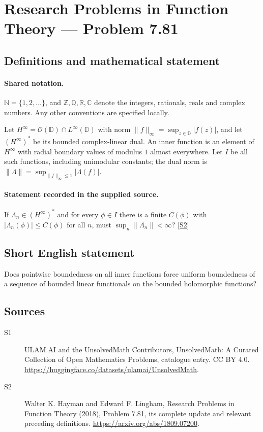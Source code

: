 \documentclass[11pt]{article}
\newcommand{\sref}[2]{\hyperlink{source:#1:#2}{[S#2]}}
\begin{document}
\section{Research Problems in Function Theory — Problem 7.81}\label{statement}

\subsection{Definitions and mathematical statement}

\paragraph{Shared notation.}$\mathbb N=\{1,2,\ldots\}$, and $\mathbb Z,\mathbb Q,\mathbb R,\mathbb C$ denote the integers, rationals, reals and complex numbers. Any other conventions are specified locally.


Let $H^\infty=\mathcal O(\mathbb D)\cap L^\infty(\mathbb D)$ with norm $\|f\|_\infty=\sup_{z\in\mathbb D}|f(z)|$, and let $(H^\infty)^*$ be its bounded complex-linear dual. An inner function is an element of $H^\infty$ with radial boundary values of modulus $1$ almost everywhere. Let $I$ be all such functions, including unimodular constants; the dual norm is $\|\Lambda\|=\sup_{\|f\|_\infty\le1}|\Lambda(f)|$.
\paragraph{Statement recorded in the supplied source.}
If $\Lambda_n\in(H^\infty)^*$ and for every $\phi\in I$ there is a finite $C(\phi)$ with $|\Lambda_n(\phi)|\le C(\phi)$ for all $n$, must $\sup_n\|\Lambda_n\|<\infty$? \sref{statement}{2}
\subsection{Short English statement}
Does pointwise boundedness on all inner functions force uniform boundedness of a sequence of bounded linear functionals on the bounded holomorphic functions?
\subsection{Sources}
\begin{description}
\item[\hypertarget{source:statement:1}{S1}] ULAM.AI and the UnsolvedMath Contributors, UnsolvedMath: A Curated Collection of Open Mathematics Problems, catalogue entry. CC BY 4.0. \url{https://huggingface.co/datasets/ulamai/UnsolvedMath}.
\item[\hypertarget{source:statement:2}{S2}] Walter K. Hayman and Edward F. Lingham, Research Problems in Function Theory (2018), Problem 7.81, its complete update and relevant preceding definitions. \url{https://arxiv.org/abs/1809.07200}.
\end{description}
\label{end:statement}
\end{document}
